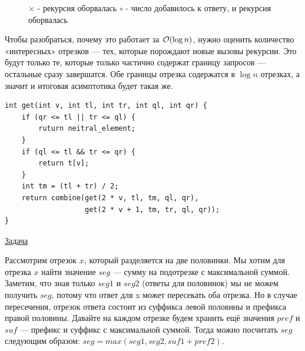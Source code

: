 \begin{center}
	\begin{figure}[h]
		\captionsetup{font=small, labelformat=empty}
		\caption{$\times$ - рекурсия оборвалась $\circ$ - число добавилось к ответу, и рекурсия оборвалась}
		\label{fig:image}
	\end{figure}
\end{center}

Чтобы разобраться, почему это работает за $\mathcal{O}(\log n)$, нужно оценить количество «интересных» отрезков — тех, которые порождают новые вызовы рекурсии. Это будут только те, которые только частично содержат границу запросов — остальные сразу завершатся. Обе границы отрезка содержатся в $\log n$ отрезках, а значит и итоговая асимптотика будет такая же.

\begin{verbatim}
int get(int v, int tl, int tr, int ql, int qr) {
	if (qr <= tl || tr <= ql) {
		ruturn neitral_element;
	}
	if (ql <= tl && tr <= qr) {
		return t[v];
	}
	int tm = (tl + tr) / 2;
	return combine(get(2 * v, tl, tm, ql, qr),
	               get(2 * v + 1, tm, tr, ql, qr));
}
\end{verbatim}

\pagebreak

 \href{https://codeforces.com/edu/course/2/lesson/4/2/practice/contest/273278/problem/A}{Задача}

Рассмотрим отрезок $x$, который разделяется на две половинки. Мы хотим для отрезка $x$ найти значение $seg$ — сумму на подотрезке с максимальной суммой. Заметим, что зная только $seg1$ и $seg2$ (ответы для половинок) мы не можем получить $seg$, потому что ответ для x может пересекать оба отрезка. Но в случае пересечения, отрезок ответа состоит из суффикса левой половины и префикса правой половины. Давайте на каждом отрезке будем хранить ещё значения $pref$ и $suf$ — префикс и суффикс с максимальной суммой. Тогда можно посчитать $seg$ следующим образом: $seg=max(seg1,seg2,suf1+pref2)$.

